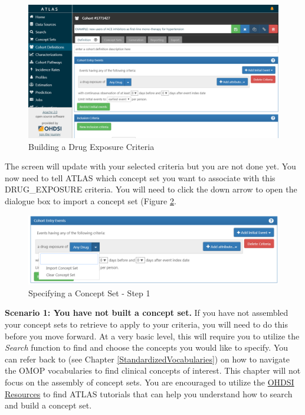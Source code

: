 \documentclass[11pt]{book}
\theoremstyle{definition}
\theoremstyle{definition}
\theoremstyle{definition}
\theoremstyle{remark}
\begin{document}
\begin{figure}

{\centering \includegraphics[width=0.9\linewidth]{images/Cohorts/ATLAS-drugexposure} 

}

\caption{Building a Drug Exposure Criteria}\label{fig:ATLASdrugexposure}
\end{figure}

The screen will update with your selected criteria but you are not done yet. You now need to tell ATLAS which concept set you want to associate with this DRUG\_EXPOSURE criteria. You will need to click the down arrow to open the dialogue box to import a concept set (Figure \ref{fig:ATLASimportconcept}.

\begin{figure}

{\centering \includegraphics[width=0.9\linewidth]{images/Cohorts/ATLAS-importaconcept} 

}

\caption{Specifying a Concept Set - Step 1}\label{fig:ATLASimportconcept}
\end{figure}

\textbf{Scenario 1: You have not built a concept set.} If you have not assembled your concept sets to retrieve to apply to your criteria, you will need to do this before you move forward. At a very basic level, this will require you to utilize the \emph{Search} function to find and choose the concepts you would like to specify. You can refer back to (see Chapter \ref{StandardizedVocabularies}) on how to navigate the OMOP vocabularies to find clinical concepts of interest. This chapter will not focus on the assembly of concept sets. You are encouraged to utilize the \href{https://www.ohdsi.org/resources/}{OHDSI Resources} to find ATLAS tutorials that can help you understand how to search and build a concept set.
\end{document}
